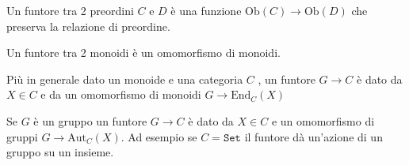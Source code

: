\begin{example}{}
    Un funtore tra 2 preordini \(C\) e \(D\) è una funzione \(\mathrm{Ob}{(C)} \to \mathrm{Ob}{(D)}\)  che preserva la relazione di preordine.
\end{example}

\begin{example}{}
    Un funtore tra 2 monoidi è un omomorfismo di monoidi.

    Più in generale dato un monoide e una categoria \(C\) , un funtore \(G \to C\) è dato da \(X \in C\) e da un omomorfismo di monoidi \(G \to \mathrm{End}_C{(X)}\) 

    Se \(G\) è un gruppo un funtore \(G \to C\) è dato da \(X \in C\) e un
    omomorfismo di gruppi \(G \to \mathrm{Aut}_C{(X)}\). Ad esempio se \(C = \mathtt{Set}\) il funtore dà un'azione di un gruppo su un insieme.
\end{example}




